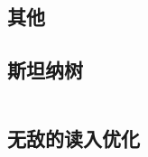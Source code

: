 \documentclass[landscape, oneside, a4paper, cs4size]{book}
\newcommand{\cppcode}[1]{
	\inputminted[mathescape,
	frame=lines,linenos]{cpp}{source/#1}
}
\begin{document}
\begin{multicols}{2}
\begin{spacing}{0.8}
















\section{其他}


\subsection{斯坦纳树}

\cppcode{miscellany/Steiner-Tree.cpp}


\subsection{无敌的读入优化}

\cppcode{miscellany/Reader.cpp}



\end{spacing}
\end{multicols}
\end{document}
